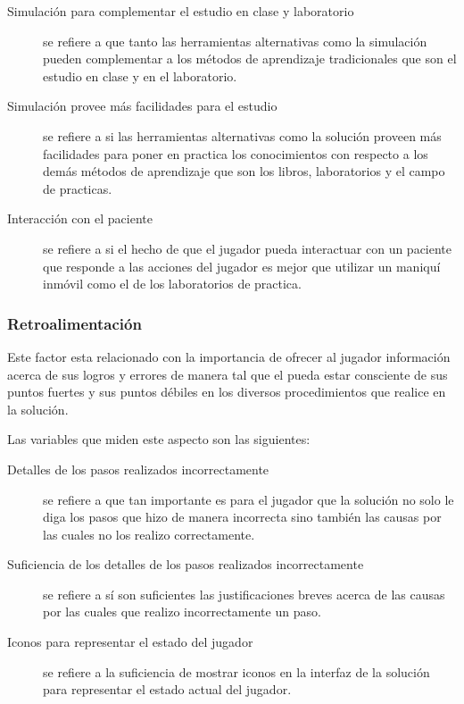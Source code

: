 \begin{description}

\item[Simulación para complementar el estudio en clase y laboratorio] se
    refiere a que tanto las herramientas alternativas como la simulación pueden
    complementar a los métodos de aprendizaje tradicionales que son el estudio
    en clase y en el laboratorio.

\item[Simulación provee más facilidades para el estudio] se refiere a si las
    herramientas alternativas como la solución proveen más facilidades para
    poner en practica los conocimientos con respecto a los demás métodos de
    aprendizaje que son los libros, laboratorios y el campo de practicas.

\item[Interacción con el paciente] se refiere a si el hecho de que el jugador
    pueda interactuar con un paciente que responde a las acciones del jugador es
    mejor que utilizar un maniquí inmóvil como el de los laboratorios de
    practica.

\end{description}

\subsubsection{Retroalimentación}

Este factor esta relacionado con la importancia de ofrecer al jugador
información acerca de sus logros y errores de manera tal que el pueda estar
consciente de sus puntos fuertes y sus puntos débiles en los diversos
procedimientos que realice en la solución.

Las variables que miden este aspecto son las siguientes:

\begin{description}

\item[Detalles de los pasos realizados incorrectamente] se refiere a que tan
    importante es para el jugador que la solución no solo le diga los pasos que
    hizo de manera incorrecta sino también las causas por las cuales no los
    realizo correctamente.

\item[Suficiencia de los detalles de los pasos realizados incorrectamente] se
    refiere a sí son suficientes las justificaciones breves acerca de las causas
    por las cuales que realizo incorrectamente un paso.

\item[Iconos para representar el estado del jugador] se refiere a la
    suficiencia de mostrar iconos en la interfaz de la solución para
    representar el estado actual del jugador.

\end{description}

